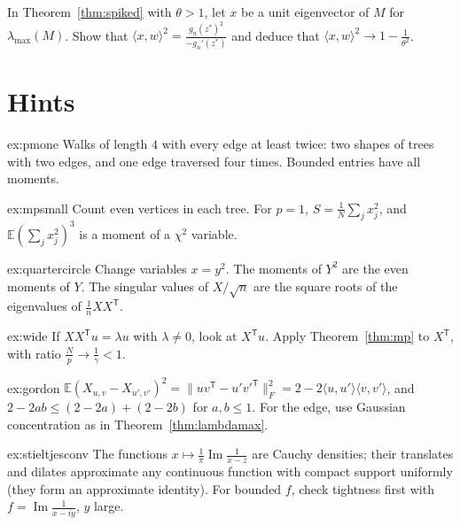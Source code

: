 \begin{exercise}[$\star\star\star$]\label{ex:overlap}
In Theorem~\ref{thm:spiked} with $\theta>1$, let $x$ be a unit eigenvector of $M$ for $\lambda_{\max}(M)$. Show that $\langle x,w\rangle^2=\frac{g_n(z^*)^2}{-g_n'(z^*)}$ and deduce that $\langle x,w\rangle^2\to1-\frac1{\theta^2}$.
\end{exercise}

\section{Hints}

\begin{hint}{ex:pmone}
Walks of length $4$ with every edge at least twice: two shapes of trees with two edges, and one edge traversed four times. Bounded entries have all moments.
\end{hint}

\begin{hint}{ex:mpsmall}
Count even vertices in each tree. For $p=1$, $S=\frac1N\sum_jx_j^2$, and $\mathbb E(\sum_jx_j^2)^3$ is a moment of a $\chi^2$ variable.
\end{hint}

\begin{hint}{ex:quartercircle}
Change variables $x=y^2$. The moments of $Y^2$ are the even moments of $Y$. The singular values of $X/\sqrt n$ are the square roots of the eigenvalues of $\frac1nXX^{\mathsf T}$.
\end{hint}

\begin{hint}{ex:wide}
If $XX^{\mathsf T}u=\lambda u$ with $\lambda\ne0$, look at $X^{\mathsf T}u$. Apply Theorem~\ref{thm:mp} to $X^{\mathsf T}$, with ratio $\frac Np\to\frac1\gamma<1$.
\end{hint}

\begin{hint}{ex:gordon}
$\mathbb E(X_{u,v}-X_{u',v'})^2=\|uv^{\mathsf T}-u'v'^{\mathsf T}\|_F^2=2-2\langle u,u'\rangle\langle v,v'\rangle$, and $2-2ab\le(2-2a)+(2-2b)$ for $a,b\le1$. For the edge, use Gaussian concentration as in Theorem~\ref{thm:lambdamax}.
\end{hint}

\begin{hint}{ex:stieltjesconv}
The functions $x\mapsto\frac1\pi\operatorname{Im}\frac1{x-z}$ are Cauchy densities; their translates and dilates approximate any continuous function with compact support uniformly (they form an approximate identity). For bounded
$f$, check tightness first with $f=\operatorname{Im}\frac1{x-iy}$, $y$ large.
\end{hint}

